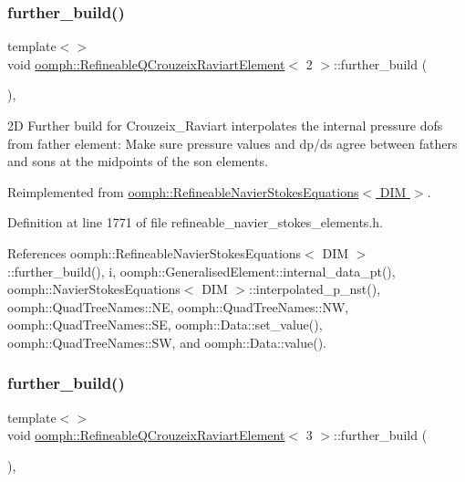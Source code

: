 \subsubsection{\texorpdfstring{further\+\_\+build()}{further\_build()}\hspace{0.1cm}{\footnotesize\ttfamily [2/3]}}
{\footnotesize\ttfamily template$<$$>$ \\
void \hyperlink{classoomph_1_1RefineableQCrouzeixRaviartElement}{oomph\+::\+Refineable\+Q\+Crouzeix\+Raviart\+Element}$<$ 2 $>$\+::further\+\_\+build (\begin{DoxyParamCaption}{ }\end{DoxyParamCaption})\hspace{0.3cm}{\ttfamily [inline]}, {\ttfamily [virtual]}}

2D Further build for Crouzeix\+\_\+\+Raviart interpolates the internal pressure dofs from father element\+: Make sure pressure values and dp/ds agree between fathers and sons at the midpoints of the son elements. 

Reimplemented from \hyperlink{classoomph_1_1RefineableNavierStokesEquations_a7afd6250585ea597c3df65b8c7744da4}{oomph\+::\+Refineable\+Navier\+Stokes\+Equations$<$ D\+I\+M $>$}.



Definition at line 1771 of file refineable\+\_\+navier\+\_\+stokes\+\_\+elements.\+h.



References oomph\+::\+Refineable\+Navier\+Stokes\+Equations$<$ D\+I\+M $>$\+::further\+\_\+build(), i, oomph\+::\+Generalised\+Element\+::internal\+\_\+data\+\_\+pt(), oomph\+::\+Navier\+Stokes\+Equations$<$ D\+I\+M $>$\+::interpolated\+\_\+p\+\_\+nst(), oomph\+::\+Quad\+Tree\+Names\+::\+NE, oomph\+::\+Quad\+Tree\+Names\+::\+NW, oomph\+::\+Quad\+Tree\+Names\+::\+SE, oomph\+::\+Data\+::set\+\_\+value(), oomph\+::\+Quad\+Tree\+Names\+::\+SW, and oomph\+::\+Data\+::value().

\mbox{\label{classoomph_1_1RefineableQCrouzeixRaviartElement_aa0cba37e6068fb2a43584bbbd5857a67}} 
\subsubsection{\texorpdfstring{further\+\_\+build()}{further\_build()}\hspace{0.1cm}{\footnotesize\ttfamily [3/3]}}
{\footnotesize\ttfamily template$<$$>$ \\
void \hyperlink{classoomph_1_1RefineableQCrouzeixRaviartElement}{oomph\+::\+Refineable\+Q\+Crouzeix\+Raviart\+Element}$<$ 3 $>$\+::further\+\_\+build (\begin{DoxyParamCaption}{ }\end{DoxyParamCaption})\hspace{0.3cm}{\ttfamily [inline]}, {\ttfamily [virtual]}}

